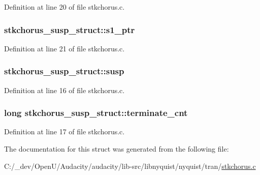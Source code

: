 Definition at line 20 of file stkchorus.\+c.

\subsubsection[{\texorpdfstring{s1\+\_\+ptr}{s1_ptr}}]{ stkchorus\+\_\+susp\+\_\+struct\+::s1\+\_\+ptr}\hypertarget{structstkchorus__susp__struct_a871f250e3263e7ffca9784d072294972}{}\label{structstkchorus__susp__struct_a871f250e3263e7ffca9784d072294972}


Definition at line 21 of file stkchorus.\+c.

\subsubsection[{\texorpdfstring{susp}{susp}}]{ stkchorus\+\_\+susp\+\_\+struct\+::susp}\hypertarget{structstkchorus__susp__struct_adc39b0774fd6fc0e00fffd6af7d7840b}{}\label{structstkchorus__susp__struct_adc39b0774fd6fc0e00fffd6af7d7840b}


Definition at line 16 of file stkchorus.\+c.

\subsubsection[{\texorpdfstring{terminate\+\_\+cnt}{terminate_cnt}}]{\setlength{\rightskip}{0pt plus 5cm}long stkchorus\+\_\+susp\+\_\+struct\+::terminate\+\_\+cnt}\hypertarget{structstkchorus__susp__struct_ab6597d621345ca24477fc9b94aed4b25}{}\label{structstkchorus__susp__struct_ab6597d621345ca24477fc9b94aed4b25}


Definition at line 17 of file stkchorus.\+c.



The documentation for this struct was generated from the following file\+:\begin{DoxyCompactItemize}
\item 
C\+:/\+\_\+dev/\+Open\+U/\+Audacity/audacity/lib-\/src/libnyquist/nyquist/tran/\hyperlink{stkchorus_8c}{stkchorus.\+c}\end{DoxyCompactItemize}
